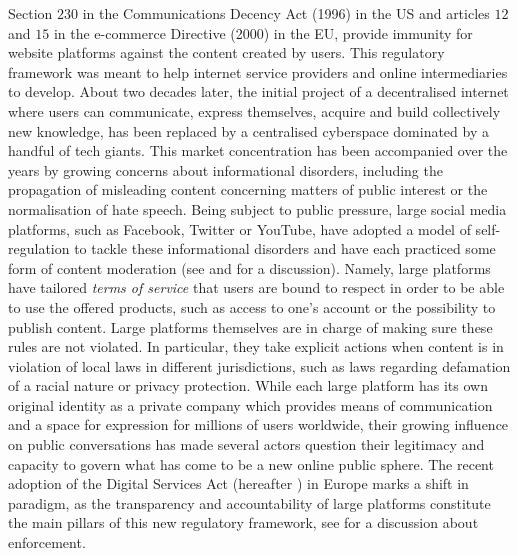 \documentclass[Afour,sageh,times]{sagej}
\begin{document}
Section $230$ in the Communications Decency Act (1996) in the US and articles $12$ and $15$ in the e-commerce Directive (2000) in the EU,  provide immunity for website platforms against the content created by users. This regulatory framework was meant to help internet service providers and online intermediaries to develop. About two decades later, the initial project of a decentralised internet where users can communicate, express themselves, acquire and build collectively new knowledge, has been replaced by a centralised cyberspace dominated by a handful of tech giants.  This market concentration has been accompanied over the years by growing concerns about informational disorders, including the propagation of misleading content concerning matters of public interest or the normalisation of hate speech. Being subject to public pressure, large social media platforms, such as Facebook, Twitter or YouTube, have adopted a model of self-regulation to tackle these informational disorders and have each practiced some form of content moderation (see \cite{gillespie2018custodians} and  \cite{kaye2019speech} for a discussion). Namely, large platforms have tailored {\it terms of service} that users are bound to respect in order to be able to use the offered products, such as access to one's account or the possibility to publish content. Large platforms themselves are in charge of making sure these rules are not violated. In particular, they take explicit actions when content is in violation of local laws in different jurisdictions, such as laws regarding defamation of a racial nature or privacy protection. While each large platform has its own original identity as a private company which provides means of communication and a space for expression for millions of users worldwide, their growing influence on public conversations has made several actors question their legitimacy and capacity to govern what has come to be a new online public sphere. The recent adoption of the Digital Services Act (hereafter \cite{dsa}) in Europe marks a shift in paradigm, as the transparency and accountability of large platforms constitute the main pillars of this new regulatory framework, see \cite{hoboken2022dsa} for a discussion about enforcement. 
\end{document}
